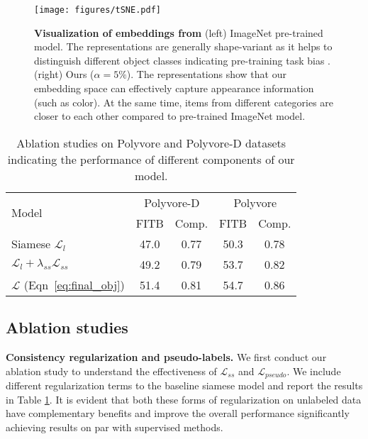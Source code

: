 \documentclass[sigconf]{acmart}
\begin{document}
\begin{figure*}[th!]
    \centering
    \texttt{[image: figures/tSNE.pdf]}
    \caption{{\bf Visualization of embeddings from} (left) ImageNet pre-trained model. The representations are generally shape-variant as it helps to distinguish different object classes indicating pre-training task bias \cite{simclr,moco}. (right)  Ours ($\alpha=5\%$). The representations show that our embedding space can effectively capture appearance information (such as color). At the same time, items from different categories are closer to each other compared to pre-trained ImageNet model.}
    \label{fig:tsne}
\end{figure*}

\begin{table}[t]
    \centering
    \caption{Ablation studies on Polyvore and Polyvore-D datasets indicating the performance of different components of our model.}
    \vspace{1mm}


    \begin{tabular}{l|cc|cc}
    \hline
         \multirow{2}{*}{Model} &  \multicolumn{2}{c|}{Polyvore-D} &  \multicolumn{2}{c}{Polyvore} \\
        \cline{2-5}
        & FITB & Comp.& FITB & Comp. \\
        \hline
        Siamese $\mathcal{L}_{l}$ & 47.0 & 0.77 & 50.3 & 0.78 \\
        $\mathcal{L}_{l} + \lambda_{ss} \mathcal{L}_{ss}$  & 49.2 & 0.79 & 53.7 & 0.82\\
        $\mathcal{L}$ (Eqn~\ref{eq:final_obj}) & 51.4 & 0.81 & 54.7 & 0.86 \\
    \hline 
    \end{tabular}
\label{tab:ablation}
\end{table}


\subsection{Ablation studies}
\label{sec:ablations}
\noindent \textbf{Consistency regularization and pseudo-labels.} We first conduct our ablation study to understand the effectiveness of $\mathcal{L}_{ss}$ and $\mathcal{L}_{pseudo}$. We include different regularization terms to the baseline siamese model and report the results in Table \ref{tab:ablation}. 
It is evident that both these forms of regularization on unlabeled data have complementary benefits and improve the overall performance significantly achieving results on par with supervised methods.  
\end{document}
